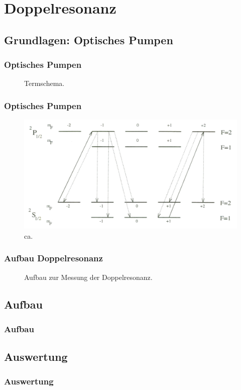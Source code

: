 
\section{Doppelresonanz}
\subsection{Grundlagen: Optisches Pumpen}


\begin{frame}
\frametitle{Optisches Pumpen}

  \begin{figure}
    \centering
    \def\svgwidth{0.45\textwidth}
    
    \caption{Termschema.}
\end{figure}
\end{frame}




\begin{frame}
\frametitle{Optisches Pumpen}

\begin{figure}[H]
\begin{center}
  \includegraphics[width=\textwidth]{../img/optPumpen.png}
  \caption{ca.}
\end{center}
\end{figure}

\end{frame}


\begin{frame}
\frametitle{Aufbau Doppelresonanz}

\begin{figure}
    \centering
    \def\svgwidth{\textwidth}
    
    \caption{Aufbau zur Messung der Doppelresonanz.}
\end{figure}

\end{frame}




\subsection{Aufbau}
\begin{frame}
\frametitle{Aufbau}
  
\end{frame}

\subsection{Auswertung}
\begin{frame}
\frametitle{Auswertung}
  
\end{frame}